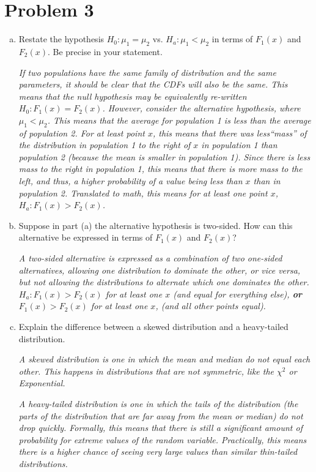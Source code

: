 \documentclass[12pt]{article}
\begin{document}
\section*{Problem 3}
\begin{enumerate}[(a)]
\item Restate the hypothesis $H_0: \mu_1 = \mu_2$ vs. $H_a: \mu_1 < \mu_2$ in terms of $F_1(x)$ and $F_2(x)$. Be precise in your statement.

\emph{If two populations have the same family of distribution and the same parameters, it should be clear that the CDFs will also be the same. This means that the null hypothesis may be equivalently re-written $H_0: F_1(x) = F_2(x)$. However, consider the alternative hypothesis, where $\mu_1 < \mu_2$. This means that the average for population 1 is less than the average of population 2. For at least point $x$, this means that there was less``mass'' of the distribution in population 1 to the right of $x$ in population 1 than population 2 (because the mean is smaller in population 1). Since there is less mass to the right in population 1, this means that there is more mass to the left, and thus, a higher probability of a value being less than $x$ than in population 2. Translated to math, this means for at least one point $x$, $H_a: F_1(x) > F_2(x)$.}

\item Suppose in part (a) the alternative hypothesis is two-sided. How can this alternative be expressed in terms of $F_1(x)$ and $F_2(x)$?

\emph{A two-sided alternative is expressed as a combination of two one-sided alternatives, allowing one distribution to dominate the other, or vice versa, but not allowing the distributions to alternate which one dominates the other. $H_a: F_1(x) > F_2(x)$ for at least one $x$ (and equal for everything else), {\bf or} $F_1(x) > F_2(x)$ for at least one $x$, (and all other points equal).}

\item Explain the difference between a skewed distribution and a heavy-tailed distribution.

\emph{A skewed distribution is one in which the mean and median do not equal each other. This happens in distributions that are not symmetric, like the $\chi^2$ or Exponential.}

\emph{A heavy-tailed distribution is one in which the tails of the distribution (the parts of the distribution that are far away from the mean or median) do not drop quickly. Formally, this means that there is still a significant amount of probability for extreme values of the random variable. Practically, this means there is a higher chance of seeing very large values than similar thin-tailed distributions.}



\end{enumerate}
\end{document}
